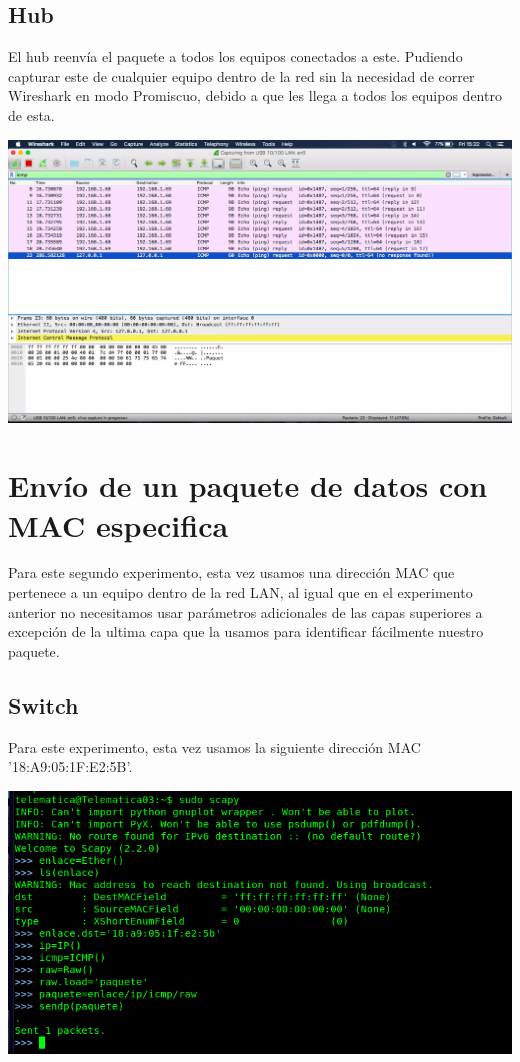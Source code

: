 \documentclass[spanish]{udpreport}
\begin{document}
\subsection{Hub}

El hub reenvía el paquete a todos los equipos conectados a este. Pudiendo capturar este de cualquier equipo dentro de la red sin la necesidad de correr Wireshark en modo Promiscuo, debido a que les llega a todos los equipos dentro de esta.

\begin{center}
	\includegraphics[scale=.3]{imagenes/Hub/FF.jpg}
\end{center}


\section{Envío de un paquete de datos con MAC especifica}

Para este segundo experimento, esta vez usamos una dirección MAC que pertenece a un equipo dentro de la red LAN, al igual que en el experimento anterior no necesitamos usar parámetros adicionales de las capas superiores a excepción de la ultima capa que la usamos para identificar fácilmente nuestro paquete.

\subsection{Switch}

Para este experimento, esta vez usamos la siguiente dirección MAC '18:A9:05:1F:E2:5B'.
\begin{center}
	\includegraphics[scale=.37]{imagenes/Switch/Test_2.png}
\end{center}
\end{document}
